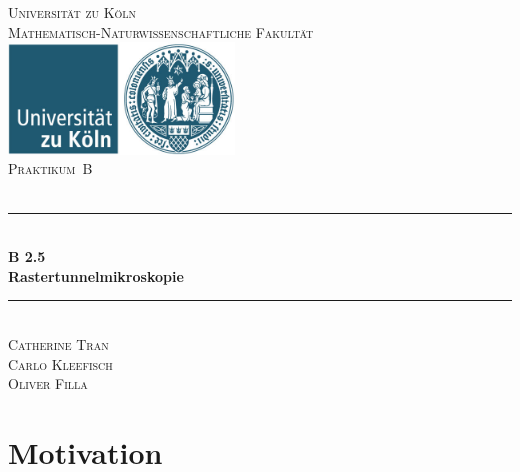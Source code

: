 \documentclass[12pt,a4paper]{scrartcl}
\numberwithin{equation}{section} %
\newcommand{\HRule}{\rule{\linewidth}{0.7mm}}
\begin{document}
\begin{titlepage}
	\pagestyle{empty}

	\begin{center}

	\textsc{\LARGE Universität zu Köln }\\ [0.4cm]
	\textsc{Mathematisch-Naturwissenschaftliche Fakultät} \\[1.5cm]

	\includegraphics[width=0.45\textwidth]{../media/uni.jpg}\\[1.5cm]  %

	\textsc{\Large Praktikum~B}\\[2mm]
	\textsc{}\\[10mm]
	\HRule \\[0.4cm]

		{	\Huge \bfseries B 2.5}\\[0.4cm]
			{	\huge \bfseries Rastertunnelmikroskopie}\\[0.3cm]
	
	\HRule \\[3cm]

			\textsc{\Large Catherine Tran } \\[3pt]
		\textsc{\Large Carlo Kleefisch } \\[3pt]
		\textsc{\Large Oliver Filla } \\[3pt]
		
	\end{center}
\end{titlepage}

\newpage
\tableofcontents
\newpage

\hypertarget{motivation}{%
\section{Motivation}\label{motivation}}
\end{document}
